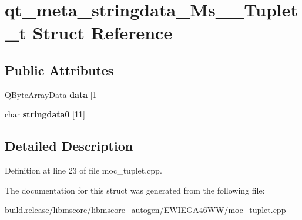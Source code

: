 \hypertarget{structqt__meta__stringdata___ms_____tuplet__t}{}\section{qt\+\_\+meta\+\_\+stringdata\+\_\+\+Ms\+\_\+\+\_\+\+Tuplet\+\_\+t Struct Reference}
\label{structqt__meta__stringdata___ms_____tuplet__t}
\subsection*{Public Attributes}
\begin{DoxyCompactItemize}
\item 
\mbox{\label{structqt__meta__stringdata___ms_____tuplet__t_a3969f65adbce82445cb386df1d4c30d4}} 
Q\+Byte\+Array\+Data {\bfseries data} \mbox{[}1\mbox{]}
\item 
\mbox{\label{structqt__meta__stringdata___ms_____tuplet__t_af9ff762b0e9c5b9e008c40d71bc291cf}} 
char {\bfseries stringdata0} \mbox{[}11\mbox{]}
\end{DoxyCompactItemize}


\subsection{Detailed Description}


Definition at line 23 of file moc\+\_\+tuplet.\+cpp.



The documentation for this struct was generated from the following file\+:\begin{DoxyCompactItemize}
\item 
build.\+release/libmscore/libmscore\+\_\+autogen/\+E\+W\+I\+E\+G\+A46\+W\+W/moc\+\_\+tuplet.\+cpp\end{DoxyCompactItemize}
